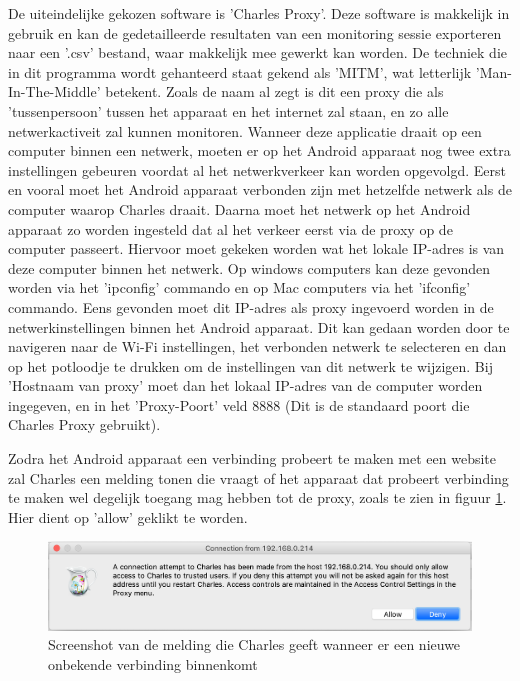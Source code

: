 De uiteindelijke gekozen software is 'Charles Proxy'. Deze software is makkelijk in gebruik en kan de gedetailleerde resultaten van een monitoring sessie exporteren naar een '.csv' bestand, waar makkelijk mee gewerkt kan worden. De techniek die in dit programma wordt gehanteerd staat gekend als 'MITM', wat letterlijk 'Man-In-The-Middle' betekent. Zoals de naam al zegt is dit een proxy die als 'tussenpersoon' tussen het apparaat en het internet zal staan, en zo alle netwerkactiveit zal kunnen monitoren. Wanneer deze applicatie draait op een computer binnen een netwerk, moeten er op het Android apparaat nog twee extra instellingen gebeuren voordat al het netwerkverkeer kan worden opgevolgd. Eerst en vooral moet het Android apparaat verbonden zijn met hetzelfde netwerk als de computer waarop Charles draait. Daarna moet het netwerk op het Android apparaat zo worden ingesteld dat al het verkeer eerst via de proxy op de computer passeert. Hiervoor moet gekeken worden wat het lokale IP-adres is van deze computer binnen het netwerk. Op windows computers kan deze gevonden worden via het 'ipconfig' commando en op Mac computers via het 'ifconfig' commando. Eens gevonden moet dit IP-adres als proxy ingevoerd worden in de netwerkinstellingen binnen het Android apparaat. Dit kan gedaan worden door te navigeren naar de Wi-Fi instellingen, het verbonden netwerk te selecteren en dan op het potloodje te drukken om de instellingen van dit netwerk te wijzigen. Bij 'Hostnaam van proxy' moet dan het lokaal IP-adres van de computer worden ingegeven, en in het 'Proxy-Poort' veld 8888 (Dit is de standaard poort die Charles Proxy gebruikt). 

Zodra het Android apparaat een verbinding probeert te maken met een website zal Charles een melding tonen die vraagt of het apparaat dat probeert verbinding te maken wel degelijk toegang mag hebben tot de proxy, zoals te zien in figuur \ref{fig:charlesmelding}. Hier dient op 'allow' geklikt te worden. 

\begin{figure}
    \centering
    \includegraphics[width=1\textwidth]{img/charlesmelding.png}
    \caption{Screenshot van de melding die Charles geeft wanneer er een nieuwe onbekende verbinding binnenkomt}
    \label{fig:charlesmelding}
\end{figure}


